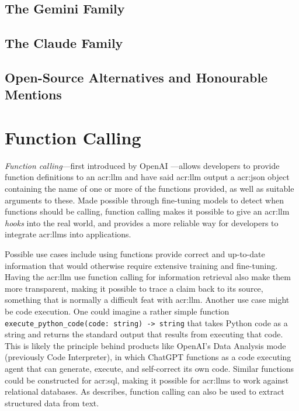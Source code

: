\subsection{The Gemini  Family}
\subsection{The Claude Family}
\subsection{Open-Source Alternatives and Honourable Mentions}


\section[Function Calling LLMs]{Function Calling }
\label{sec:function-calling}

\textit{Function calling}---first introduced by OpenAI \citep{eletiFunctionCallingOther2023}---allows developers to provide function definitions to an \gls{acr:llm} and have said \gls{acr:llm} output a \acrshort{acr:json} object containing the name of one or more of the functions provided, as well as suitable arguments to these. Made possible through fine-tuning models to detect when functions should be calling, function calling makes it possible to give an \gls{acr:llm} \textit{hooks} into the real world, and provides a more reliable way for developers to integrate \glspl{acr:llm} into applications.

Possible use cases include using functions provide correct and up-to-date information that would otherwise require extensive training and fine-tuning. Having the \gls{acr:llm} use function calling for information retrieval also make them more transparent, making it possible to trace a claim back to its source, something that is normally a difficult feat with \gls{acr:llm}. Another use case might be code execution. One could imagine a rather simple function \texttt{execute\_python\_code(code: string) -> string} that takes Python code as a string and returns the standard output that results from executing that code. This is likely the principle behind products like OpenAI's Data Analysis mode (previously Code Interpreter), in which ChatGPT functions as a code executing agent that can generate, execute, and self-correct its own code. Similar functions could be constructed for \acrshort{acr:sql}, making it possible for \glspl{acr:llm} to work against relational databases. As \cite{eletiFunctionCallingOther2023} describes, function calling can also be used to extract structured data from text.




\glsresetall
